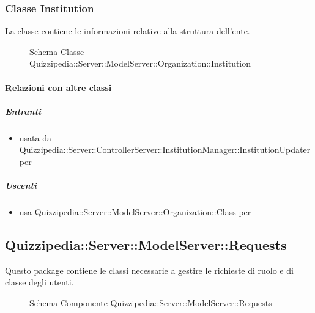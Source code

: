 \subsubsection{Classe Institution}
La classe contiene le informazioni relative alla struttura dell'ente.
\begin{figure}[H]
\centering
\noindent{}
\caption[Schema Classe Institution]{Schema Classe Quizzipedia::Server::ModelServer::Organization::Institution}
\end{figure}
\paragraph{Relazioni con altre classi}
\subparagraph{Entranti}
\begin{itemize}
\item usata da Quizzipedia::Server::ControllerServer::InstitutionManager::InstitutionUpdater per 
\end{itemize}
\subparagraph{Uscenti}
\begin{itemize}
\item usa Quizzipedia::Server::ModelServer::Organization::Class per 
\end{itemize}
\subsection{Quizzipedia::Server::ModelServer::Requests}
Questo package contiene le classi necessarie a gestire le richieste di ruolo e di classe degli utenti.
\begin{figure}[H]
\centering
\noindent{}
\caption[Schema Componente Quizzipedia::Server::ModelServer::Requests]{Schema Componente Quizzipedia::Server::ModelServer::Requests}
\end{figure}
